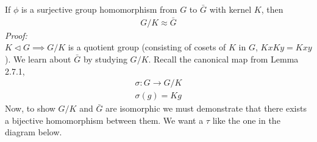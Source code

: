 \begin{theorem} 
If $\phi$ is a surjective group homomorphism from $G$ to $\bar{G}$ with kernel $K$, then
\begin{align}
    G/K\approx \bar{G} \nonumber
\end{align}
\textit{Proof:}\\
$K\triangleleft G \implies G/K$ is a quotient group (consisting of cosets of $K$ in $G$, $KxKy=Kxy$). We learn about $\bar{G}$ by studying $G/K$. Recall the canonical map from Lemma 2.7.1,
\begin{align}
    \sigma : G \rightarrow G/K \nonumber \\
    \sigma(g)=Kg \nonumber
\end{align}
Now, to show $G/K$ and $\bar{G}$ are isomorphic we must demonstrate that there exists a bijective homomorphism between them. We want a $\tau$ like the one in the diagram below.\steezybreak\\


\end{theorem}
